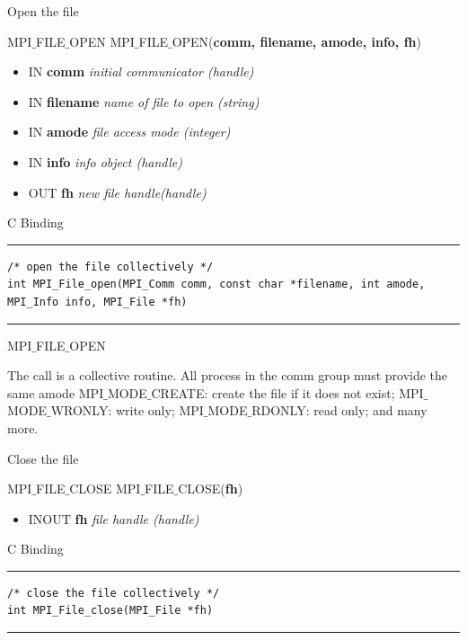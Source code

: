 \documentclass[xcolor=dvipsnames]{beamer}
\begin{document}
\begin{frame}[fragile]{Open the file}
\begin{block}{MPI$\_$FILE$\_$OPEN \cite{mpi40}}
MPI$\_$FILE$\_$OPEN(\textbf{comm, filename, amode, info, fh})
\\
\begin{itemize}
\item[] IN \textbf{comm} \: \textit{initial communicator (handle)}\\
\item[] IN \textbf{filename} \: \textit{name of file to open (string)}\\
\item[] IN \textbf{amode} \: \textit{file access mode (integer)}
\item[] IN \textbf{info} \: \textit{info object (handle)}\\
\item[] OUT  \textbf{fh} \: \textit{new file handle(handle)} \\
\end{itemize}
\end{block}

C Binding
\rule{\textwidth}{1pt}
\scriptsize
\begin{verbatim}
/* open the file collectively */
int MPI_File_open(MPI_Comm comm, const char *filename, int amode,
MPI_Info info, MPI_File *fh)
\end{verbatim}
\rule{\textwidth}{1pt}
\end{frame}

\begin{frame}{MPI$\_$FILE$\_$OPEN}
\begin{outline}
\1 The call is a collective routine.
\2 All process in the comm group must provide the same amode
\3 MPI$\_$MODE$\_$CREATE: create the file if it does not exist;
\3 MPI$\_$MODE$\_$WRONLY: write only;
\3 MPI$\_$MODE$\_$RDONLY: read only;
\3 and many more.
\end{outline}
\end{frame}

\begin{frame}[fragile]{Close the file}
\begin{block}{MPI$\_$FILE$\_$CLOSE \cite{mpi40}}
MPI$\_$FILE$\_$CLOSE(\textbf{fh})
\\
\begin{itemize}
\item[] INOUT  \textbf{fh} \: \textit{file handle (handle)} \\
\end{itemize}
\end{block}

C Binding
\rule{\textwidth}{1pt}
\scriptsize
\begin{verbatim}
/* close the file collectively */
int MPI_File_close(MPI_File *fh)
\end{verbatim}
\rule{\textwidth}{1pt}
\end{frame}
\end{document}
